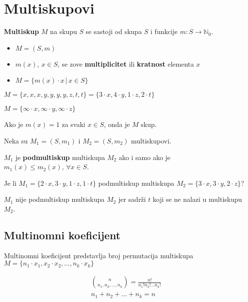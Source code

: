 \section{Multiskupovi}

\textbf{Multiskup} $M$ na skupu $S$ se sastoji od skupa $S$ i funkcije
$m: S\to\mathbb{N}_0$.

\begin{itemize}
    \item $M = (S, m)$
    \item $m(x),\, x\in S$, se zove \textbf{multiplicitet} ili \textbf{kratnost} elementa $x$
    \item $M = \{m(x) \cdot x \,|\, x \in S\}$
\end{itemize}

\begin{example}
    $M = \{x,x,x,y,y,y,y,z,t,t\} = \{3\cdot x, 4 \cdot y, 1 \cdot z, 2 \cdot t\}$
\end{example}

\begin{example}
    $M = \{\infty \cdot x, \infty \cdot y, \infty \cdot z\}$
\end{example}

Ako je $m(x) = 1$ za svaki $x\in S$, onda je $M$ skup.

\bigskip
Neka su $M_1 = (S, m_1)$ i $M_2 = (S, m_2)$ multiskupovi.

$M_1$ je \textbf{podmultiskup} multiskupa $M_2$ ako i samo ako je $m_1(x) \leq m_2(x),\, \forall x \in S$.

\begin{problem}
    Je li $M_1 = \{2\cdot x, 3 \cdot y, 1 \cdot z, 1 \cdot t\}$ podmultiskup
    multiskupa $M_2 = \{3\cdot x, 3 \cdot y, 2 \cdot z\}$?
\end{problem}

$M_1$ nije podmultiskup multiskupa $M_2$ jer sadrži $t$ koji se ne nalazi u
multiskupu $M_2$.

\subsection{Multinomni koeficijent}

Multinomni koeficijent predstavlja broj permutacija multiskupa $M = \{n_1\cdot x_1, x_2 \cdot x_2, \dots, n_k \cdot x_k\}$

\begin{gather*}
    \binom{n}{n_1, n_2, \dots, n_k} = \frac{n!}{n_1!n_2!\dots n_k!}\\
    n_1+n_2+\dots+n_k = n
\end{gather*}

